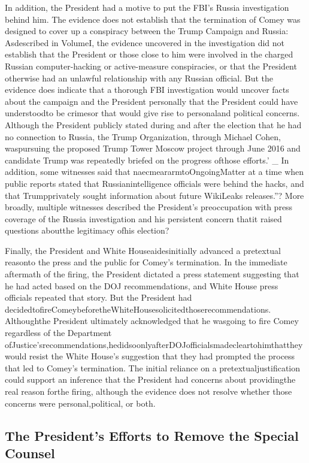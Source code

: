 {In addition, the President had a motive to put the FBI’s Russia investigation behind him.
The evidence does not establish that the termination of Comey was designed to cover up a conspiracy between the Trump Campaign and Russia: Asdescribed in VolumeI, the evidence uncovered in the investigation did not establish that the President or those close to him were involved in the charged Russian computer-hacking or active-measure conspiracies, or that the President otherwise had an unlawful relationship with any Russian official.
But the evidence does indicate that a thorough FBI investigation would uncover facts about the campaign and the President personally that the President could have understoodto be crimesor that would give rise to personaland political concerns.
Although the President publicly stated during and after the election that he had no connection to Russia, the Trump Organization, through Michael Cohen, waspursuing the proposed Trump Tower Moscow project through June 2016 and candidate Trump was repeatedly briefed on the progress ofthose efforts.’ _
In addition, some witnesses said that naecmeararmtoOngoingMatter
at a time when public reports stated that Russianintelligence officials were behind the hacks, and that Trumpprivately sought information about future WikiLeaks releases.”?
More broadly, multiple witnesses described the President’s preoccupation with press coverage of the Russia investigation and his persistent concern thatit raised questions aboutthe legitimacy ofhis election?

Finally, the President and White Houseaidesinitially advanced a pretextual reasonto the press and the public for Comey’s termination.
In the immediate aftermath of the firing, the President dictated a press statement suggesting that he had acted based on the DOJ recommendations, and White House press officials repeated that story.
But the President had decidedtofireComeybeforetheWhiteHousesolicitedthoserecommendations.
Althoughthe President ultimately acknowledged that he wasgoing to fire Comey regardless of the Department ofJustice’srecommendations,hedidsoonlyafterDOJofficialsmadecleartohimthattheywould resist the White House’s suggestion that they had prompted the process that led to Comey’s termination.
The initial reliance on a pretextualjustification could support an inference that the President had concerns about providingthe real reason forthe firing, although the evidence does not resolve whether those concerns were personal,political, or both.

\subsection{The President's Efforts to Remove the Special Counsel}

}
